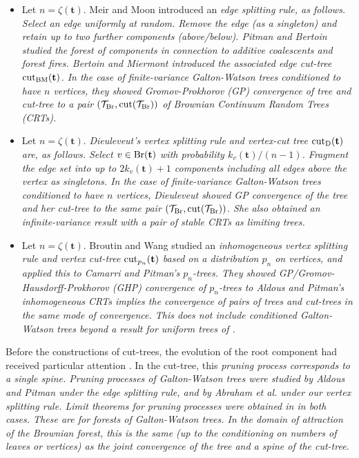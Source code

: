 \documentclass[11pt,a4paper]{article}
\newcommand{\cT}{\mathcal{T}}
\newcommand{\ft}{\mathbf{t}}
\begin{document}
\begin{itemize}
  \item Let $n=\zeta(\ft)$. Meir and Moon \cite{MeirMoon} introduced an \em edge splitting rule\em, as follows. Select an edge uniformly at random. Remove the edge (as a singleton) and retain up to two further components (above/below). Pitman \cite{Pitman1999} and Bertoin \cite{Bertoin2012} studied the forest of components in connection to
    additive coalescents and forest fires. Bertoin and Miermont \cite{BM} introduced the associated \em edge cut-tree \em ${\rm cut}_{\rm BM}(\ft)$. In the case of
    finite-variance Galton-Watson trees conditioned to have $n$ vertices, they showed Gromov-Prokhorov (GP) convergence of tree and cut-tree to a pair
    $(\cT_{\rm Br},{\rm cut}(\cT_{\rm Br}))$ of Brownian Continuum Random Trees (CRTs).%
  \item Let $n=\zeta(\ft)$. \em Dieuleveut's \cite{Die13} vertex splitting rule and vertex-cut tree \em ${\rm cut}_{\rm D}(\ft)$ are, as
    follows. Select $v\in{\rm Br}(\ft)$ with probability $k_v(\ft)/(n-1)$. Fragment the edge set into up to $2k_v(\ft)+1$
    components including all edges above the vertex as singletons. In the case of finite-variance Galton-Watson trees conditioned to have $n$ vertices,
    Dieuleveut showed GP convergence of the tree and her cut-tree to the same pair $(\cT_{\rm Br},{\rm cut}(\cT_{\rm Br}))$. She also obtained an
    infinite-variance result with a pair of stable CRTs as limiting trees.%
  \item Let $n=\zeta(\ft)$. Broutin and Wang \cite{BW16} studied an \em inhomogeneous vertex splitting rule and vertex cut-tree \em ${\rm cut}_{p_n}(\ft)$ based on a
    distribution $p_n$ on vertices, and applied this to Camarri and Pitman's \cite{CP00} $p_n$-trees. They showed GP/Gromov-Hausdorff-Prokhorov (GHP)
    convergence of $p_n$-trees to Aldous and Pitman's inhomogeneous CRTs \cite{AP00} implies the convergence of pairs of trees and cut-trees in the same mode of
    convergence. This does not include conditioned Galton-Watson trees beyond a result for uniform trees of \cite{Bertoin2012}.%
\end{itemize}
Before the constructions of cut-trees, the evolution of the root component had received particular attention
\cite{AD12b,ABBH14,Bertoin2012,Janson06,MeirMoon,Panholzer2006}. In the cut-tree, this \em pruning process \em corresponds to a single spine. Pruning processes of
Galton-Watson trees were studied by Aldous and Pitman \cite{AP98} under the edge splitting
rule, and by Abraham et al. \cite{ADH12} under our vertex splitting rule. Limit theorems for pruning processes were obtained in \cite{HW} in both cases. These are
for forests of Galton-Watson trees. In the domain of attraction of the Brownian forest, this is the same (up to the conditioning on numbers of leaves or vertices) as the
joint convergence of the tree and a spine of the cut-tree.
\end{document}
